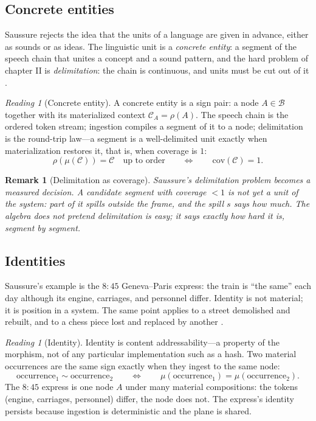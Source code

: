 \documentclass[11pt,a4paper]{article}
\newtheorem{remark}[principle]{Remark}
\theoremstyle{remark}
\newtheorem{reading}[principle]{Reading}
\newcommand{\Lat}{\ensuremath{\mathcal{B}}}              %
\newcommand{\Ctx}{\ensuremath{\mathcal{C}}}              %
\newcommand{\Ing}{\ensuremath{\mu}}                      %
\newcommand{\Mat}{\ensuremath{\rho}}                     %
\newcommand{\Cov}{\ensuremath{\mathrm{cov}}}             %
\begin{document}
\subsection{Concrete entities}
\label{sec:concrete}

Saussure rejects the idea that the units of a language are given in advance,
either as sounds or as ideas. The linguistic unit is a \emph{concrete entity}:
a segment of the speech chain that unites a concept and a sound pattern, and
the hard problem of chapter II is \emph{delimitation}: the chain is
continuous, and units must be cut out of it \cite[Part II, ch.~II]{harris1983}.

\begin{reading}[Concrete entity]
\label{read:concrete}
A concrete entity is a sign pair: a node $A \in \Lat$ together with its
materialized context $\Ctx_A = \Mat(A)$. The speech chain is the ordered token
stream; ingestion compiles a segment of it to a node; delimitation is the
round-trip law---a segment is a well-delimited unit exactly when
materialization restores it, that is, when coverage is $1$:
\[
  \Mat(\Ing(\Ctx)) = \Ctx \quad \text{up to order}
  \qquad\Longleftrightarrow\qquad
  \Cov(\Ctx) = 1 .
\]
\end{reading}

\begin{remark}[Delimitation as coverage]
Saussure's delimitation problem becomes a measured decision. A candidate
segment with coverage $<1$ is not yet a unit of the system: part of it spills
outside the frame, and the spill $s$ says how much. The algebra does not
pretend delimitation is easy; it says exactly how hard it is, segment by
segment.
\end{remark}

\subsection{Identities}
\label{sec:identities}

Saussure's example is the $8{:}45$ Geneva--Paris express: the train is ``the
same'' each day although its engine, carriages, and personnel differ. Identity
is not material; it is position in a system. The same point applies to a
street demolished and rebuilt, and to a chess piece lost and replaced by
another \cite[Part II, ch.~III]{harris1983}.

\begin{reading}[Identity]
\label{read:identity}
Identity is content addressability---a property of the morphism, not of any
particular implementation such as a hash. Two material occurrences are the
same sign exactly when they ingest to the same node:
\[
  \text{occurrence}_1 \sim \text{occurrence}_2
  \qquad\Longleftrightarrow\qquad
  \Ing(\text{occurrence}_1) = \Ing(\text{occurrence}_2).
\]
The $8{:}45$ express is one node $A$ under many material compositions: the
tokens (engine, carriages, personnel) differ, the node does not. The
express's identity persists because ingestion is deterministic and the plane
is shared.
\end{reading}
\end{document}
